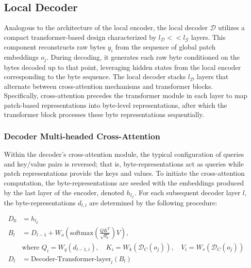 \subsection{Local Decoder} 

Analogous to the architecture of the local encoder, the local decoder $\mathcal{D}$ utilizes a compact transformer-based design characterized by $l_{\mathcal{D}} << l_{\mathcal{G}}$ layers. This component reconstructs raw bytes $y_i$ from the sequence of global patch embeddings $o_j$. During decoding, it generates each raw byte conditioned on the bytes decoded up to that point, leveraging hidden states from the local encoder corresponding to the byte sequence. The local decoder stacks $l_{\mathcal{D}}$ layers that alternate between cross-attention mechanisms and transformer blocks. Specifically, cross-attention precedes the transformer module in each layer to map patch-based representations into byte-level representations, after which the transformer block processes these byte representations sequentially.

\subsubsection{Decoder Multi-headed Cross-Attention} 

Within the decoder's cross-attention module, the typical configuration of queries and key/value pairs is reversed; that is, byte-representations act as queries while patch representations provide the keys and values. To initiate the cross-attention computation, the byte-representations are seeded with the embeddings produced by the last layer of the encoder, denoted $h_{l_{\mathcal{E}}}$. For each subsequent decoder layer $l$, the byte-representations $d_{l,i}$ are determined by the following procedure:

\begin{align}
D_0 &= h_{l_{\mathcal{E}}} \\
B_l &= D_{l-1} + W_o\left(\text{softmax}\left(\frac{QK^T}{\sqrt{d_k}}\right)V\right), \\
  &\text{where } Q_i = W_q(d_{l-1,i}), \quad K_i = W_k(\mathcal{D}_C(o_j)), \quad V_i = W_v(\mathcal{D}_C(o_j)) \\
  D_l &= \text{Decoder-Transformer-layer}_l(B_l)
\end{align}

